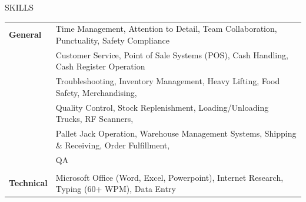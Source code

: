 \documentclass{resume} %
\begin{document}
%
%

\begin{rSection}{SKILLS}

\begin{tabular}{ @{} >{\bfseries}l @{\hspace{6ex}} l }
General 
& Time Management, Attention to Detail, Team Collaboration, Punctuality, Safety Compliance \\
& Customer Service, Point of Sale Systems (POS), Cash Handling, Cash Register Operation \\
& Troubleshooting, Inventory Management, Heavy Lifting, Food Safety, Merchandising, \\
& Quality Control, Stock Replenishment, Loading/Unloading Trucks, RF Scanners, \\
& Pallet Jack Operation, Warehouse Management Systems, Shipping \& Receiving, Order Fulfillment, \\  
& QA \\ \\

Technical
& Microsoft Office (Word, Excel, Powerpoint), Internet Research, Typing (60+ WPM), Data Entry


\end{tabular}
\end{rSection}
\end{document}
